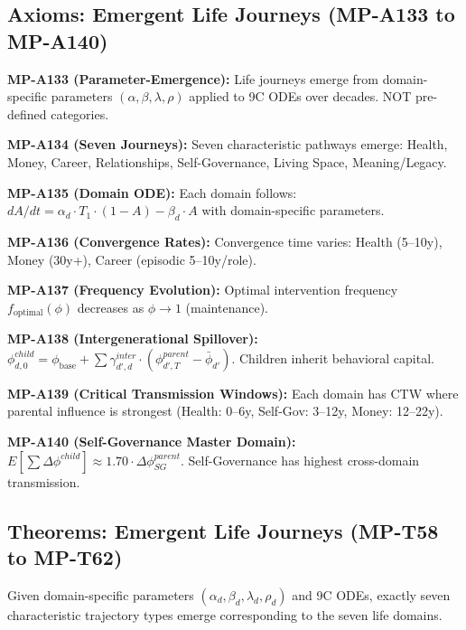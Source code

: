 \subsection{Axioms: Emergent Life Journeys (MP-A133 to MP-A140)}

\begin{tcolorbox}[colback=red!3!white, colframe=red!50!black,
    title=\textbf{Axioms: Emergent Life Journeys Theory (Chapter 24)}]

\textbf{MP-A133 (Parameter-Emergence):} Life journeys emerge from domain-specific parameters $(\alpha, \beta, \lambda, \rho)$ applied to 9C ODEs over decades. NOT pre-defined categories.

\textbf{MP-A134 (Seven Journeys):} Seven characteristic pathways emerge: Health, Money, Career, Relationships, Self-Governance, Living Space, Meaning/Legacy.

\textbf{MP-A135 (Domain ODE):} Each domain follows: $dA/dt = \alpha_d \cdot T_1 \cdot (1-A) - \beta_d \cdot A$ with domain-specific parameters.

\textbf{MP-A136 (Convergence Rates):} Convergence time varies: Health (5--10y), Money (30y+), Career (episodic 5--10y/role).

\textbf{MP-A137 (Frequency Evolution):} Optimal intervention frequency $f_{\text{optimal}}(\phi)$ decreases as $\phi \to 1$ (maintenance).

\textbf{MP-A138 (Intergenerational Spillover):} $\phi^{child}_{d,0} = \phi_{\text{base}} + \sum \gamma^{inter}_{d',d} \cdot (\phi^{parent}_{d',T} - \bar{\phi}_{d'})$. Children inherit behavioral capital.

\textbf{MP-A139 (Critical Transmission Windows):} Each domain has CTW where parental influence is strongest (Health: 0--6y, Self-Gov: 3--12y, Money: 12--22y).

\textbf{MP-A140 (Self-Governance Master Domain):} $E[\sum \Delta\phi^{child}] \approx 1.70 \cdot \Delta\phi^{parent}_{SG}$. Self-Governance has highest cross-domain transmission.

\end{tcolorbox}

\subsection{Theorems: Emergent Life Journeys (MP-T58 to MP-T62)}

\begin{theorem}
Given domain-specific parameters $(\alpha_d, \beta_d, \lambda_d, \rho_d)$ and 9C ODEs, exactly seven characteristic trajectory types emerge corresponding to the seven life domains.
\end{theorem}

